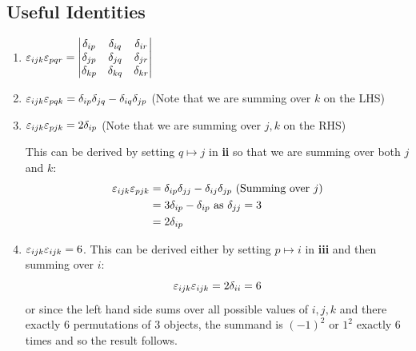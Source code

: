 \documentclass[../main.tex]{subfiles}
\begin{document}
\subsection{Useful Identities}
\begin{enumerate}
  \item $\varepsilon_{ijk} \varepsilon_{pqr} =
      \begin{vmatrix}
      \delta_{i p} & \delta_{i q} & \delta_{i r} \\
      \delta_{j p} & \delta_{j q} & \delta_{j r} \\
      \delta_{k p} & \delta_{k q} & \delta_{k r} \\
      \end{vmatrix}$
  \item $\varepsilon_{ijk} \varepsilon_{pqk} = \delta_{i p} \delta_{j q} - \delta_{i q} \delta_{j p}$ (Note that we are summing over $k$ on the LHS)
  \item $\varepsilon_{ijk} \varepsilon_{pjk} = 2\delta_{i p}$ (Note that we are summing over $j, k$ on the RHS)\par
      This can be derived by setting $q \mapsto j$ in \textbf{ii} so that we are summing over both $j$ and $k$:
      \begin{align*}
        \varepsilon_{i j k}\varepsilon_{p j k} &= \delta_{i p}\delta_{j j} - \delta_{i j}\delta_{j p} \text{ (Summing over $j$)}\\
                                   &= 3\delta_{i p} - \delta_{i p} \text{ as $\delta_{j j} = 3$}\\
                                   &= 2\delta_{i p}
      \end{align*}
  \item $\varepsilon_{ijk} \varepsilon_{ijk} = 6$.
    This can be derived either by setting $p \mapsto i$ in \textbf{iii} and then summing over $i$:
    \[
      \varepsilon_{i j k}\varepsilon_{i j k} = 2\delta_{i i} = 6
    \]
    or since the left hand side sums over all possible values of $i, j, k$ and there exactly 6 permutations of 3 objects, the summand is $(-1)^2$ or $1^2$ exactly 6 times and so the result follows.
\end{enumerate}
\end{document}
